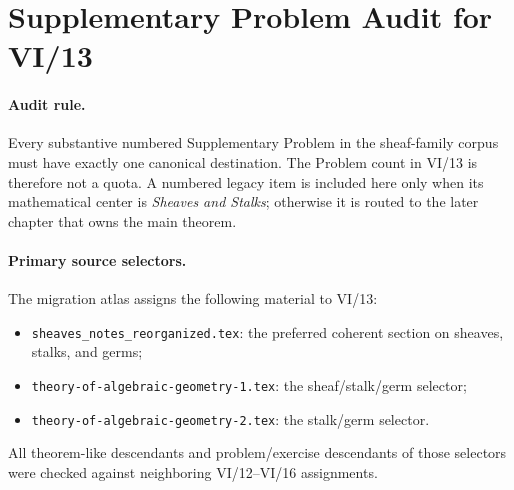 \section*{Supplementary Problem Audit for VI/13}

\paragraph{Audit rule.}
Every substantive numbered Supplementary Problem in the sheaf-family corpus must have exactly one
canonical destination.  The Problem count in VI/13 is therefore not a quota.  A numbered
legacy item is included here only when its mathematical center is \emph{Sheaves and Stalks};
otherwise it is routed to the later chapter that owns the main theorem.

\paragraph{Primary source selectors.}
The migration atlas assigns the following material to VI/13:
\begin{itemize}
\item \texttt{sheaves\_notes\_reorganized.tex}: the preferred coherent section on sheaves,
      stalks, and germs;
\item \texttt{theory-of-algebraic-geometry-1.tex}: the sheaf/stalk/germ selector;
\item \texttt{theory-of-algebraic-geometry-2.tex}: the stalk/germ selector.
\end{itemize}
All theorem-like descendants and problem/exercise descendants of those selectors were
checked against neighboring VI/12--VI/16 assignments.


